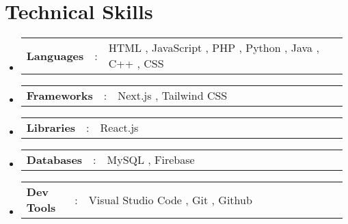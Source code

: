 \documentclass[a4paper,11pt]{article}
\makeatletter
\newcommand{\resumeItem}[1]{
  \item\small{#1}
}
\newcommand{\resumeItemListStart}{\begin{itemize}[rightmargin=0.11in]}
\newcommand{\resumeItemListEnd}{\end{itemize}}
\newcommand{\resumeSectionType}[3]{
  \item\begin{tabular*}{0.96\textwidth}[t]{
    p{0.15\linewidth}p{0.02\linewidth}p{0.81\linewidth}
  }
    \textbf{#1} & #2 & #3
  \end{tabular*}\vspace{-2pt}
}
\newcommand{\resumeQuadHeading}[4]{
  \item
  \begin{tabular*}{0.96\textwidth}[t]{l@{\extracolsep{\fill}}r}
    \textbf{#1} & #2 \\
    \textit{\small#3} & \textit{\small #4} \\
  \end{tabular*}
}
\newcommand{\resumeQuadHeadingChild}[2]{
  \item
  \begin{tabular*}{0.96\textwidth}[t]{l@{\extracolsep{\fill}}r}
    \textbf{\small#1} & {\small#2} \\
  \end{tabular*}
}
\newcommand{\resumeHeadingListStart}{
  \begin{itemize}[leftmargin=0.15in, label={}]
}
\newcommand{\resumeHeadingListEnd}{\end{itemize}}
\makeatother
\begin{document}

\section{Technical Skills}
  \resumeHeadingListStart{}
    \resumeSectionType{Languages}{:}{HTML , JavaScript , PHP , Python , Java , C++ , CSS}
    \resumeSectionType{Frameworks}{:}{ Next.js , Tailwind CSS }
    \resumeSectionType{Libraries}{:}{ React.js }
    \resumeSectionType{Databases}{:}{MySQL , Firebase}
    \resumeSectionType{Dev Tools}{:}{Visual Studio Code , Git , Github}
  \resumeHeadingListEnd{}








\end{document}
